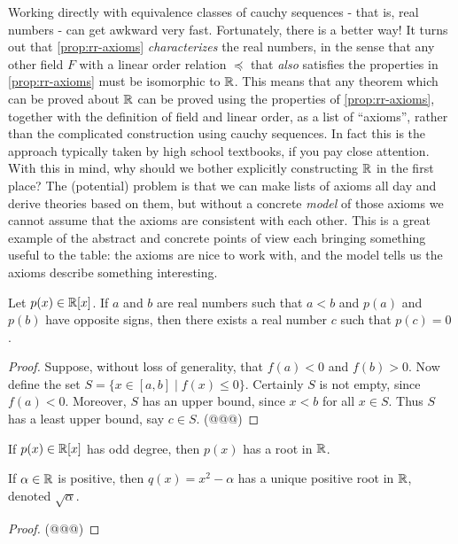 Working directly with equivalence classes of cauchy sequences - that is, real numbers - can get awkward very fast.
Fortunately, there is a better way! It turns out that \ref{prop:rr-axioms} \emph{characterizes} the real numbers, in the sense that any other field \(F\) with a linear order relation \(\preceq\) that \emph{also} satisfies the properties in \ref{prop:rr-axioms} must be isomorphic to \(\mathbb{R}\).
This means that any theorem which can be proved about \(\mathbb{R}\) can be proved using the properties of \ref{prop:rr-axioms}, together with the definition of field and linear order, as a list of ``axioms'', rather than the complicated construction using cauchy sequences.
In fact this is the approach typically taken by high school textbooks, if you pay close attention.
With this in mind, why should we bother explicitly constructing \(\mathbb{R}\) in the first place? The (potential) problem is that we can make lists of axioms all day and derive theories based on them, but without a concrete \emph{model} of those axioms we cannot assume that the axioms are consistent with each other.
This is a great example of the abstract and concrete points of view each bringing something useful to the table: the axioms are nice to work with, and the model tells us the axioms describe something interesting.

\begin{prop}
Let \(p(x) \in \mathbb{R}[x]\).
If \(a\) and \(b\) are real numbers such that \(a < b\) and \(p(a)\) and \(p(b)\) have opposite signs, then there exists a real number \(c\) such that \(p(c) = 0\).
\end{prop}

\begin{proof}
Suppose, without loss of generality, that \(f(a) < 0\) and \(f(b) > 0\).
Now define the set \(S = \{ x \in [a,b] \mid f(x) \leq 0 \}\).
Certainly \(S\) is not empty, since \(f(a) < 0\).
Moreover, \(S\) has an upper bound, since \(x < b\) for all \(x \in S\).
Thus \(S\) has a least upper bound, say \(c \in S\).
(@@@)
\end{proof}

\begin{cor} \mbox{}
\begin{proplist}
\item If \(p(x) \in \mathbb{R}[x]\) has odd degree, then \(p(x)\) has a root in \(\mathbb{R}\).
\item If \(\alpha \in \mathbb{R}\) is positive, then \(q(x) = x^2 - \alpha\) has a unique positive root in \(\mathbb{R}\), denoted \(\sqrt{\alpha}\).
\end{proplist}
\end{cor}

\begin{proof}
(@@@)
\end{proof}
